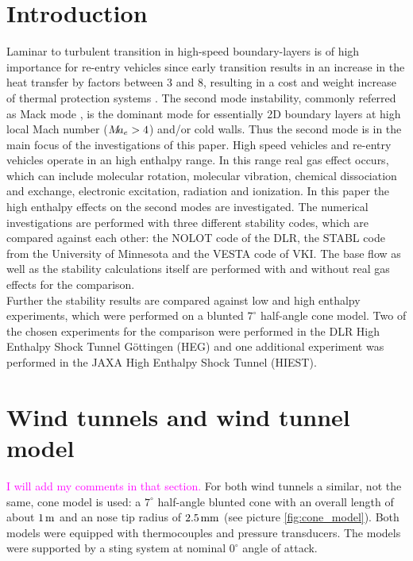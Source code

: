 \documentclass[]{aiaa-tc}%
\begin{document}
\section{Introduction}

Laminar to turbulent transition in high-speed boundary-layers is of high importance for re-entry vehicles since early transition results in an increase in the heat transfer by factors between 3 and 8, resulting in a cost and weight increase of thermal protection systems \cite{Schneider_1999,Schneider_2004}. The second mode instability, commonly referred as Mack mode \cite{Mack_1984}, is the dominant mode for essentially 2D boundary layers at high local Mach number ($M\hspace{-0.08cm} a_e > 4$) and/or cold walls\cite{Mack_1984}. Thus the second mode is in the main focus of the investigations of this paper. High speed vehicles and re-entry vehicles operate in an high enthalpy range. In this range real gas effect occurs, which can include molecular rotation, molecular vibration, chemical dissociation and exchange, electronic excitation, radiation and ionization. In this paper the high enthalpy effects on the second modes are investigated. The numerical investigations are performed with three different stability codes, which are compared against each other: the NOLOT code of the DLR, the STABL code from the University of Minnesota and the VESTA code of VKI. The base flow as well as the stability calculations itself are performed with and without real gas effects for the comparison.\\

Further the stability results are compared against low and high enthalpy experiments, which were performed on a blunted $7^\circ$ half-angle cone model. Two of the chosen experiments for the comparison were performed in the DLR High Enthalpy Shock Tunnel G\"ottingen (HEG) and one additional experiment was performed in the JAXA High Enthalpy Shock Tunnel (HIEST).






\section{Wind tunnels and wind tunnel model}\label{sect:model}
\textcolor{magenta}{I will add my comments in that section.}
For both wind tunnels a similar, not the same, cone model is used: a $7^\circ$ half-angle blunted cone with an overall length of about $1 \hspace{0.05cm} \rm m$ and an nose tip radius of $2.5\hspace{0.05cm} \rm mm$ (see picture \ref{fig:cone_model}). Both models were equipped with thermocouples and pressure transducers. The models were supported by a sting system at nominal $0^\circ$ angle of attack.\\
\end{document}
